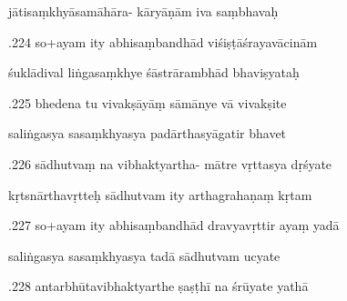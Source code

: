 \documentclass[article,12pt,a4paper]{memoir}%
\newcounter{parCount}
\begin{document}
	  
	  \pstart \leavevmode%
	jātisaṃkhyāsamāhāra- kāryāṇām iva saṃbhavaḥ 
	{}
	\pend%
      

	  
	  \pstart {}.224 so+ayam ity abhisaṃbandhād   viśiṣṭāśrayavācinām 
	{}
	\pend%
      

	  
	  \pstart \leavevmode%
	śuklādival liṅgasaṃkhye śāstrārambhād bhaviṣyataḥ 
	{}
	\pend%
      

	  
	  \pstart {}.225 bhedena tu vivakṣāyāṃ sāmānye vā vivakṣite 
	{}
	\pend%
      

	  
	  \pstart \leavevmode%
	saliṅgasya sasaṃkhyasya padārthasyāgatir bhavet 
	{}
	\pend%
      

	  
	  \pstart {}.226 sādhutvaṃ na vibhaktyartha- mātre vṛttasya dṛśyate 
	{}
	\pend%
      

	  
	  \pstart \leavevmode%
	kṛtsnārthavṛtteḥ sādhutvam ity arthagrahaṇaṃ kṛtam 
	{}
	\pend%
      

	  
	  \pstart {}.227 so+ayam ity abhisaṃbandhād dravyavṛttir ayaṃ yadā 
	{}
	\pend%
      

	  
	  \pstart \leavevmode%
	saliṅgasya sasaṃkhyasya tadā sādhutvam ucyate 
	{}
	\pend%
      

	  
	  \pstart {}.228 antarbhūtavibhaktyarthe ṣaṣṭhī na śrūyate yathā 
	{}
	\pend%
      
\end{document}

